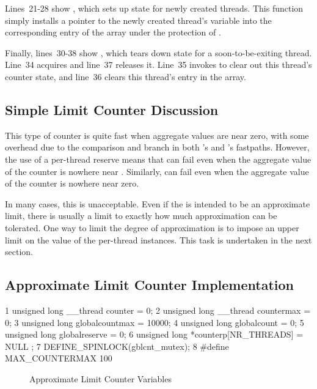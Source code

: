 Lines~21-28 show , which sets up state for
newly created threads.
This function simply installs
a pointer to the newly created thread's  variable into
the corresponding entry of the  array under the protection
of .

Finally, lines~30-38 show , which tears down
state for a soon-to-be-exiting thread.
Line~34 acquires  and line~37 releases it.
Line~35 invokes  to clear out this thread's
counter state, and line~36 clears this thread's entry in the
 array.

\subsection{Simple Limit Counter Discussion}
\label{sec:count:Simple Limit Counter Discussion}

This type of counter is quite fast when aggregate values are near zero,
with some overhead due to the comparison and branch in both
's and 's fastpaths.
However, the use of a per-thread  reserve means that
 can fail even when
the aggregate value of the counter is nowhere near .
Similarly,  can fail
even when the aggregate value of the counter is nowhere near zero.

In many cases, this is unacceptable.
Even if the  is intended to be an approximate limit,
there is usually a limit to exactly how much approximation can be tolerated.
One way to limit the degree of approximation is to impose an upper limit
on the value of the per-thread  instances.
This task is undertaken in the next section.

\subsection{Approximate Limit Counter Implementation}
\label{sec:count:Approximate Limit Counter Implementation}

{ \scriptsize
\begin{verbbox}
  1 unsigned long __thread counter = 0;
  2 unsigned long __thread countermax = 0;
  3 unsigned long globalcountmax = 10000;
  4 unsigned long globalcount = 0;
  5 unsigned long globalreserve = 0;
  6 unsigned long *counterp[NR_THREADS] = { NULL };
  7 DEFINE_SPINLOCK(gblcnt_mutex);
  8 #define MAX_COUNTERMAX 100
\end{verbbox}
}
\begin{figure}[tbp]
\centering
\theverbbox
\caption{Approximate Limit Counter Variables}
\label{fig:count:Approximate Limit Counter Variables}
\end{figure}

